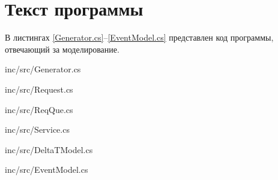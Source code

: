 \chapter{Текст программы}
В листингах \ref{Generator.cs}--\ref{EventModel.cs} представлен код программы, отвечающий за моделирование.

\begin{lstinputlisting}[
	caption={Код генератора},
	label={Generator.cs},
	language={[Sharp]C}
	]{inc/src/Generator.cs}
\end{lstinputlisting}

\newpage
\begin{lstinputlisting}[
	caption={Код заявки},
	label={Request.cs},
	language={[Sharp]C}
	]{inc/src/Request.cs}
\end{lstinputlisting}

\begin{lstinputlisting}[
	caption={Код очереди заявок},
	label={ReqQue.cs},
	language={[Sharp]C}
	]{inc/src/ReqQue.cs}
\end{lstinputlisting}

\newpage

\begin{lstinputlisting}[
	caption={Код обслуживающего аппарата},
	label={Service.cs},
	language={[Sharp]C}
	]{inc/src/Service.cs}
\end{lstinputlisting}


\newpage
\begin{lstinputlisting}[
	caption={Код модели $\Delta$t},
	label={DeltaTModel.cs},
	language={[Sharp]C}
	]{inc/src/DeltaTModel.cs}
\end{lstinputlisting}

\newpage
\begin{lstinputlisting}[
	caption={Код событийной модели},
	label={EventModel.cs},
	language={[Sharp]C}
	]{inc/src/EventModel.cs}
\end{lstinputlisting}